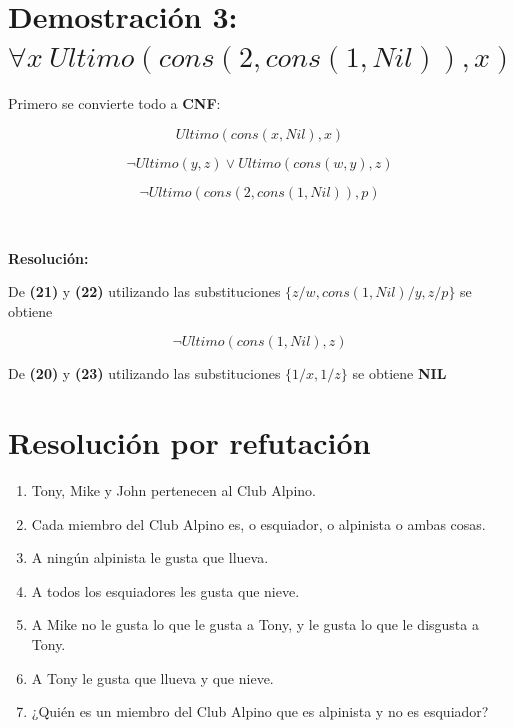 \documentclass[12pt]{article} %
\begin{document}
\section{Demostración 3: $\forall x \  Ultimo(cons(2, cons(1, Nil)), x)$}

\par Primero se convierte todo a \textbf{CNF}:

\begin{equation}
Ultimo(cons(x,Nil),x) 
\end{equation}

\begin{equation}
\neg Ultimo(y,z) \vee Ultimo(cons(w,y),z) 
\end{equation}

\begin{equation}
\neg Ultimo(cons(2,cons(1,Nil)),p) 
\end{equation}

\par \ \\

\par \textbf{Resolución:}\\

\par De \textbf{(21)} y \textbf{(22)} utilizando las substituciones $\{z/w, cons(1,Nil)/y, z/p\}$ se obtiene

\begin{equation}
\neg Ultimo(cons(1,Nil),z)
\end{equation}

\par De \textbf{(20)} y \textbf{(23)} utilizando las substituciones $\{1/x, 1/z\}$ se obtiene \textbf{NIL}

\section{Resolución por refutación}

\begin{enumerate}
\item Tony, Mike y John pertenecen al Club Alpino.
\item Cada miembro del Club Alpino es, o esquiador, o alpinista o ambas cosas.
\item A ningún alpinista le gusta que llueva.
\item A todos los esquiadores les gusta que nieve.
\item A Mike no le gusta lo que le gusta a Tony, y le gusta lo que le disgusta a Tony.
\item A Tony le gusta que llueva y que nieve.
\item ¿Quién es un miembro del Club Alpino que es alpinista y no es esquiador?
\end{enumerate}
\end{document}
